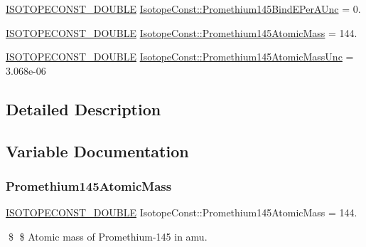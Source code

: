 \begin{DoxyCompactItemize}
\item 
\mbox{\hyperlink{group___isotope_const-_macros_ga8f45a7272ce02c0b4c65c44636ed719a}{I\+S\+O\+T\+O\+P\+E\+C\+O\+N\+S\+T\+\_\+\+D\+O\+U\+B\+LE}} \mbox{\hyperlink{group___isotope_const-_promethium-_pm145_ga0d3b8813a33276d0f4002ee1f0cf0cde}{Isotope\+Const\+::\+Promethium145\+Bind\+E\+Per\+A\+Unc}} = 0.
\item 
\mbox{\hyperlink{group___isotope_const-_macros_ga8f45a7272ce02c0b4c65c44636ed719a}{I\+S\+O\+T\+O\+P\+E\+C\+O\+N\+S\+T\+\_\+\+D\+O\+U\+B\+LE}} \mbox{\hyperlink{group___isotope_const-_promethium-_pm145_ga24271f8a1eeccbef2977dc4f515d3d83}{Isotope\+Const\+::\+Promethium145\+Atomic\+Mass}} = 144.
\item 
\mbox{\hyperlink{group___isotope_const-_macros_ga8f45a7272ce02c0b4c65c44636ed719a}{I\+S\+O\+T\+O\+P\+E\+C\+O\+N\+S\+T\+\_\+\+D\+O\+U\+B\+LE}} \mbox{\hyperlink{group___isotope_const-_promethium-_pm145_gab77b09c5836e157025bc1874d4f58965}{Isotope\+Const\+::\+Promethium145\+Atomic\+Mass\+Unc}} = 3.\+068e-\/06
\end{DoxyCompactItemize}


\subsection{Detailed Description}


\subsection{Variable Documentation}
\mbox{\label{group___isotope_const-_promethium-_pm145_ga24271f8a1eeccbef2977dc4f515d3d83}} 
\subsubsection{\texorpdfstring{Promethium145\+Atomic\+Mass}{Promethium145AtomicMass}}
{\footnotesize\ttfamily \mbox{\hyperlink{group___isotope_const-_macros_ga8f45a7272ce02c0b4c65c44636ed719a}{I\+S\+O\+T\+O\+P\+E\+C\+O\+N\+S\+T\+\_\+\+D\+O\+U\+B\+LE}} Isotope\+Const\+::\+Promethium145\+Atomic\+Mass = 144.}

\$ \$ Atomic mass of Promethium-\/145 in amu. \mbox{\label{group___isotope_const-_promethium-_pm145_gab77b09c5836e157025bc1874d4f58965}} 
